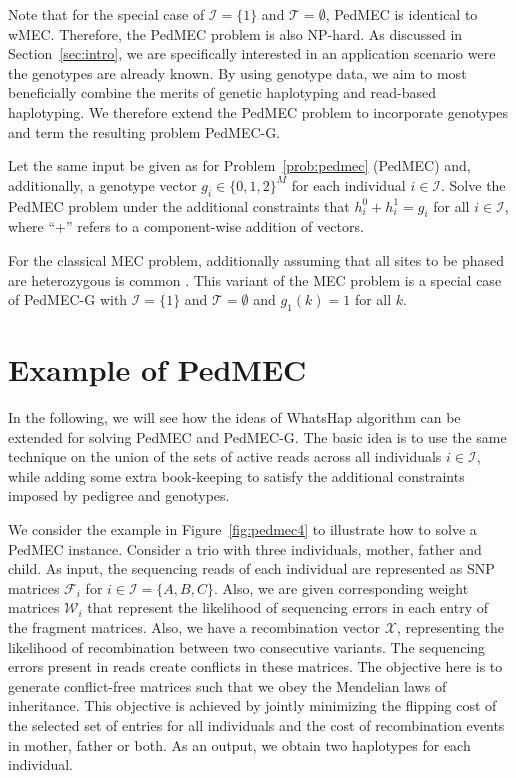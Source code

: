 Note that for the special case of $\mathcal{I}=\{1\}$ and $\mathcal{T}=\emptyset$, PedMEC is identical to wMEC.
Therefore, the PedMEC problem is also NP-hard.
As discussed in Section~\ref{sec:intro}, we are specifically interested in an application scenario were the genotypes are already known.
By using genotype data, we aim to most beneficially combine the merits of genetic haplotyping and read-based haplotyping.
We therefore extend the PedMEC problem to incorporate genotypes and term the resulting problem PedMEC-G.
\begin{problem}
Let the same input be given as for Problem~\ref{prob:pedmec} (PedMEC) and, additionally, a genotype vector $g_i\in\{0,1,2\}^M$ for each individual $i\in\mathcal{I}$. Solve the PedMEC problem under the additional constraints that $h^0_i+h^1_i=g_i$ for all $i\in\mathcal{I}$, where ``$+$'' refers to a component-wise addition of vectors.
\end{problem}

For the classical MEC problem, additionally assuming that all sites to be phased are heterozygous is common \citep{CDW13_exact}.
This variant of the MEC problem is a special case of PedMEC-G with $\mathcal{I}=\{1\}$ and $\mathcal{T}=\emptyset$ and $g_1(k)=1$ for all $k$.

\section{Example of PedMEC}
In the following, we will see how the ideas of WhatsHap algorithm can be extended for solving PedMEC and PedMEC-G.
The basic idea is to use the same technique on the union of the sets of active reads across all individuals $i\in\mathcal{I}$, while adding some extra book-keeping to satisfy the additional constraints imposed by pedigree and genotypes.

We consider the example in Figure~\ref{fig:pedmec4} to illustrate how to solve a PedMEC instance.
Consider a trio with three individuals, mother, father and child. As input, the sequencing reads of each individual are represented as SNP matrices $\mathcal{F}_i$ for $i \in \mathcal{I}=\{A,B,C\}$.
Also, we are given corresponding weight matrices $\mathcal{W}_i$ that represent the likelihood of sequencing errors in each entry of the fragment matrices.
Also, we have a recombination vector $\mathcal{X}$, representing the likelihood of recombination between two consecutive variants.
The sequencing errors present in reads create conflicts in these matrices. 
The objective here is to generate conflict-free matrices such that we obey the Mendelian laws of inheritance.
This objective is achieved by jointly minimizing the flipping cost of the selected set of entries for all individuals and the cost of recombination events in mother, father or both.
As an output, we obtain two haplotypes for each individual.

